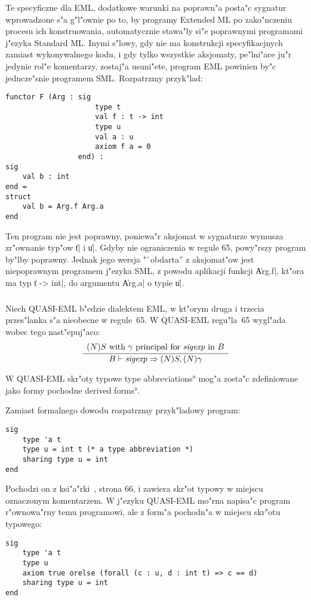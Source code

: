 Te specyficzne dla EML, dodatkowe warunki na poprawn"a posta"c sygnatur 
wprowadzone s"a g"l"ownie po to, by programy Extended ML
po za\-ko"n\-cze\-niu procesu ich konstruowania,
automatycznie stawa"ly si"e poprawnymi programami j"ezyka Standard ML.
Inymi s"lowy, gdy nie ma konstrukcji specyfikacjnych zamiast wykonywalnego kodu,
i gdy tylko wszystkie aksjomaty, pe"lni"ace ju"r jedynie rol"e komentarzy, zostaj"a usuni"ete,
program EML powinien by"c jedncze"snie programem SML.
Rozpatrzmy przyk"lad:
\begin{verbatim}
functor F (Arg : sig
                     type t
                     val f : t -> int
                     type u
                     val a : u                                         
                     axiom f a = 0
                 end) : 
sig 
    val b : int 
end =
struct
    val b = Arg.f Arg.a
end
\end{verbatim}
Ten program nie jest poprawny, poniewa"r aksjomat w sygnaturze wymusza zr"ownanie typ"ow \|t| i \|u|.
Gdyby nie ograniczenia w regule 65, powy"rszy program by"lby poprawny.
Jednak jego wersja "`obdarta'' z aksjomat"ow jest niepoprawnym programem j"ezyka SML,
z powodu aplikacji funkcji \|Arg.f|, kt"ora ma typ \|t -> int|, do argumentu \|Arg.a| o typie \|u|.

\subsubsection{\secquasi}
\label{sec:quasi}

Niech QUASI-EML b"edzie dialektem EML, w kt"orym druga i trzecia przes\-"lan\-ka s"a nieobecne w regule~65.
W QUASI-EML regu"la~65 wygl"ada wobec tego nast"epuj"aco:
$$
\frac{\begin{array}{c}
\mbox{$(N)S$ with $\gamma$ principal for ${\it sigexp}$ in $B$}\\
     \end{array}}
     {B\vdash{\it sigexp}\Rightarrow (N)S,(N)\gamma}
$$

\begin{lem}
W QUASI-EML skr"oty typowe \ang{type abbreviations}
mog"a zosta"c zdefiniowane jako formy pochodne \ang{derived forms}.
\end{lem}

Zamiast formalnego dowodu rozpatrzmy przyk"ladowy program:
\begin{verbatim}
sig
    type 'a t
    type u = int t (* a type abbreviation *)
    sharing type u = int
end
\end{verbatim}
Pochodzi on z ksi"a"rki~\cite{MT91}, strona 66, 
i zawiera skr"ot typowy w miejscu oznaczonym komentarzem.
W j"ezyku QUASI-EML mo"rna napisa"c program r"ownowa"rny 
temu programowi, ale z form"a pochodn"a w miejscu skr"otu typowego:
\begin{verbatim}
sig
    type 'a t
    type u
    axiom true orelse (forall (c : u, d : int t) => c == d)
    sharing type u = int
end
\end{verbatim}

